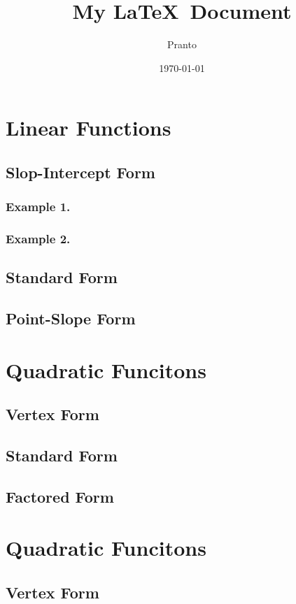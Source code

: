 \documentclass[11pt]{article}
\title{My \LaTeX\ Document}
\author{Pranto}
\date{\today} %
\begin{document}
\tableofcontents

\maketitle

\section{Linear Functions} %
    \subsection{Slop-Intercept Form} %
        \subsubsection{Example 1.} %
        \subsubsection{Example 2.} 
    \subsection{Standard Form}
    \subsection{Point-Slope Form} %
\section{Quadratic Funcitons}
    \subsection{Vertex Form}
    \subsection{Standard Form}
    \subsection{Factored Form}

\section*{Quadratic Funcitons}
    \subsection*{Vertex Form}
\end{document}
